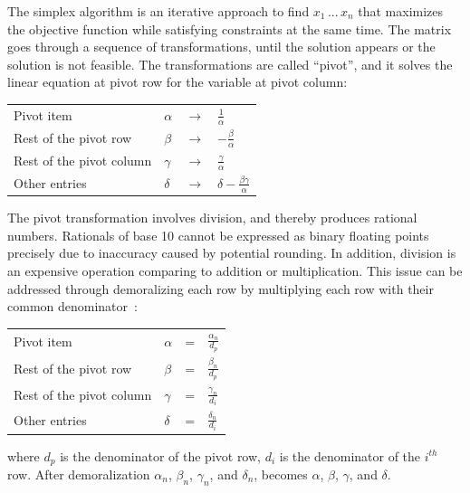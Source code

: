 \documentclass[logo,bsc,singlespacing,parskip]{infthesis}
\begin{document}
The simplex algorithm is an iterative approach to find \begin{math} x_1 \, ...
\, x_n\end{math} that maximizes the objective function while satisfying
constraints at the same time. The matrix goes through a sequence of
transformations, until the solution appears or the solution is not feasible. The
transformations are called ``pivot'', and it solves the linear equation at pivot
row for the variable at pivot column: 
\vspace*{-4mm}
\begin{table}[H]
\begin{center}
\begin{tabular}{llll}
Pivot item           & $\alpha$ & $\rightarrow$ & $\frac{1}{\alpha}$            \\
Rest of the pivot row    & $\beta$  & $\rightarrow$ & $-\frac{\beta}{\alpha}$            \\
Rest of the pivot column& $\gamma$ & $\rightarrow$ & $\frac{\gamma}{\alpha}$            \\
Other entries         & $\delta$ & $\rightarrow$ & $\delta - \frac{\beta\gamma}{\alpha}$  
\end{tabular}
\end{center}
\end{table}
\vspace*{-8mm}

The pivot transformation involves division, and thereby produces rational
numbers. Rationals of base 10 cannot be expressed as binary floating points
precisely due to inaccuracy caused by potential rounding. In addition, division
is an expensive operation comparing to addition or multiplication. This issue
can be addressed through demoralizing each row by multiplying each row with
their common denominator~\cite{FPL1}: 
\vspace*{-4mm}
\begin{table}[H]
\begin{center}
\begin{tabular}{llll}
Pivot item           & $\alpha$ & = & $\frac{\alpha_n}{d_p}$            \\
Rest of the pivot row    & $\beta$  & = & $\frac{\beta_n}{d_p}$            \\
Rest of the pivot column& $\gamma$ & = & $\frac{\gamma_n}{d_i}$            \\
Other entries         & $\delta$ & = & $\frac{\delta_n}{d_i}$  
\end{tabular}
\end{center}
\end{table}
\vspace*{-8mm}
where $d_p$ is the denominator of the pivot row, $d_i$ is the denominator of the
$i^{th}$ row. After demoralization $\alpha_n$, $\beta_n$, $\gamma_n$, and
$\delta_n$, becomes $\alpha$, $\beta$, $\gamma$, and $\delta$.
\end{document}
